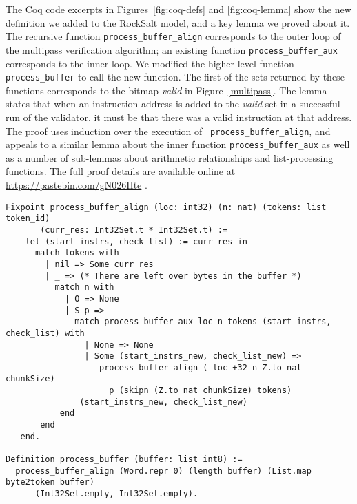 \documentclass[conference]{IEEEtran}
\begin{document}
The Coq code excerpts in Figures~\ref{fig:coq-defs} and
\ref{fig:coq-lemma} show the new definition we added to the RockSalt
model, and a key lemma we proved about it.
%
The recursive function {\tt process\_buffer\allowbreak\_align} corresponds to the
outer loop of the multipass verification algorithm; an existing
function {\tt process\_buffer\_aux} corresponds to the inner loop.
%
We modified the higher-level function {\tt process\_buffer} to call
the new function.
%
The first of the sets returned by these functions corresponds to the
bitmap {\em valid} in Figure~\ref{multipass}.
%
The lemma states that when an instruction address is added to the
{\em valid} set in a successful run of the validator, it must be that
there was a valid instruction at that address.
%
The proof uses induction over the execution of {\tt
  process\_buffer\_align}, and appeals to a similar lemma about the
inner function {\tt process\_buffer\_aux} as well as a number of
sub-lemmas about arithmetic relationships and list-processing
functions.
%
The full proof details are available online at \url{https://pastebin.com/gN026Hte} . 


\begin{figure*}
\begin{verbatim}
Fixpoint process_buffer_align (loc: int32) (n: nat) (tokens: list token_id)
       (curr_res: Int32Set.t * Int32Set.t) :=
    let (start_instrs, check_list) := curr_res in
      match tokens with
        | nil => Some curr_res
        | _ => (* There are left over bytes in the buffer *)
          match n with
            | O => None
            | S p =>
              match process_buffer_aux loc n tokens (start_instrs, check_list) with
                | None => None
                | Some (start_instrs_new, check_list_new) =>
                   process_buffer_align ( loc +32_n Z.to_nat chunkSize)
                     p (skipn (Z.to_nat chunkSize) tokens)
               (start_instrs_new, check_list_new)
           end
       end
   end.

Definition process_buffer (buffer: list int8) :=
  process_buffer_align (Word.repr 0) (length buffer) (List.map byte2token buffer)
      (Int32Set.empty, Int32Set.empty).
\end{verbatim}
  \caption{Parts of the RockSalt model added or changed to model the
    multipass validator}
\label{fig:coq-defs}
\end{figure*}
\end{document}
